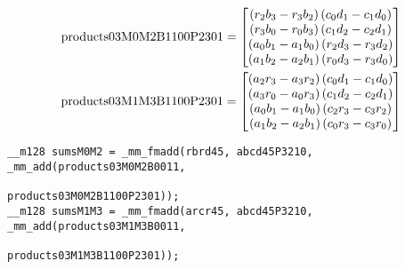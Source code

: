 \begin{align*}
\mathrm{products03M0M2B1100P2301} 
=
\begin{bmatrix}
\left(r_2b_3 - r_3b_2\right)\left(c_0d_1 - c_1d_0\right)\\
\left(r_3b_0 - r_0b_3\right)\left(c_1d_2 - c_2d_1\right)\\
\left(a_0b_1 - a_1b_0\right)\left(r_2d_3 - r_3d_2\right)\\
\left(a_1b_2 - a_2b_1\right)\left(r_0d_3 - r_3d_0\right)\\
\end{bmatrix}
\\
\mathrm{products03M1M3B1100P2301} 
=
\begin{bmatrix}
\left(a_2r_3 - a_3r_2\right)\left(c_0d_1 - c_1d_0\right)\\
\left(a_3r_0 - a_0r_3\right)\left(c_1d_2 - c_2d_1\right)\\
\left(a_0b_1 - a_1b_0\right)\left(c_2r_3 - c_3r_2\right)\\
\left(a_1b_2 - a_2b_1\right)\left(c_0r_3 - c_3r_0\right)\\
\end{bmatrix}
\end{align*}

\begin{verbatim}
__m128 sumsM0M2 = _mm_fmadd(rbrd45, abcd45P3210, _mm_add(products03M0M2B0011, 
                                                         products03M0M2B1100P2301));
__m128 sumsM1M3 = _mm_fmadd(arcr45, abcd45P3210, _mm_add(products03M1M3B0011, 
                                                         products03M1M3B1100P2301));    
\end{verbatim}


